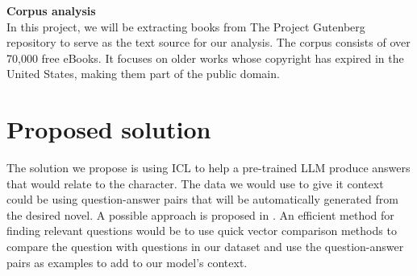 \documentclass[fleqn,moreauthors,10pt]{ds_report}
\begin{document}
\textbf{Corpus analysis} \\
In this project, we will be extracting books from The Project Gutenberg repository \cite{gutenberg} to serve as the text source for our analysis. The corpus consists of over 70,000 free eBooks. It focuses on older works whose copyright has expired in the United States, making them part of the public domain.

\section{Proposed solution}
The solution we propose is using ICL to help a pre-trained LLM produce answers that would relate to the character. The data we would use to give it context could be using question-answer pairs that will be automatically generated from the desired novel. A possible approach is proposed in \cite{mo_2023}. An efficient method for finding relevant questions would be to use quick vector comparison methods to compare the question with questions in our dataset and use the question-answer pairs as examples to add to our model's context.







\end{document}
